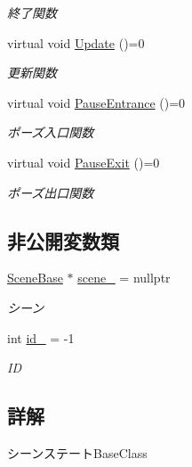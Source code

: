 \begin{DoxyCompactItemize}
\begin{DoxyCompactList}\small\item\em 終了関数 \end{DoxyCompactList}\item 
virtual void \mbox{\hyperlink{class_scene_base_1_1_state_base_ad2c6c8fd9f020eb02f64f394edee129c}{Update}} ()=0
\begin{DoxyCompactList}\small\item\em 更新関数 \end{DoxyCompactList}\item 
virtual void \mbox{\hyperlink{class_scene_base_1_1_state_base_aaf225859597bf99de1062bc55f98530d}{Pause\+Entrance}} ()=0
\begin{DoxyCompactList}\small\item\em ポーズ入口関数 \end{DoxyCompactList}\item 
virtual void \mbox{\hyperlink{class_scene_base_1_1_state_base_aba22c2bc7244d4ffcd6f159c28be2dcf}{Pause\+Exit}} ()=0
\begin{DoxyCompactList}\small\item\em ポーズ出口関数 \end{DoxyCompactList}\end{DoxyCompactItemize}
\subsection*{非公開変数類}
\begin{DoxyCompactItemize}
\item 
\mbox{\hyperlink{class_scene_base}{Scene\+Base}} $\ast$ \mbox{\hyperlink{class_scene_base_1_1_state_base_ae1062afb3f96664e24504151eaccf40f}{scene\+\_\+}} = nullptr
\begin{DoxyCompactList}\small\item\em シーン \end{DoxyCompactList}\item 
int \mbox{\hyperlink{class_scene_base_1_1_state_base_a00849bd278a086915752c8a0bd159883}{id\+\_\+}} = -\/1
\begin{DoxyCompactList}\small\item\em ID \end{DoxyCompactList}\end{DoxyCompactItemize}


\subsection{詳解}
シーンステート\+Base\+Class 

